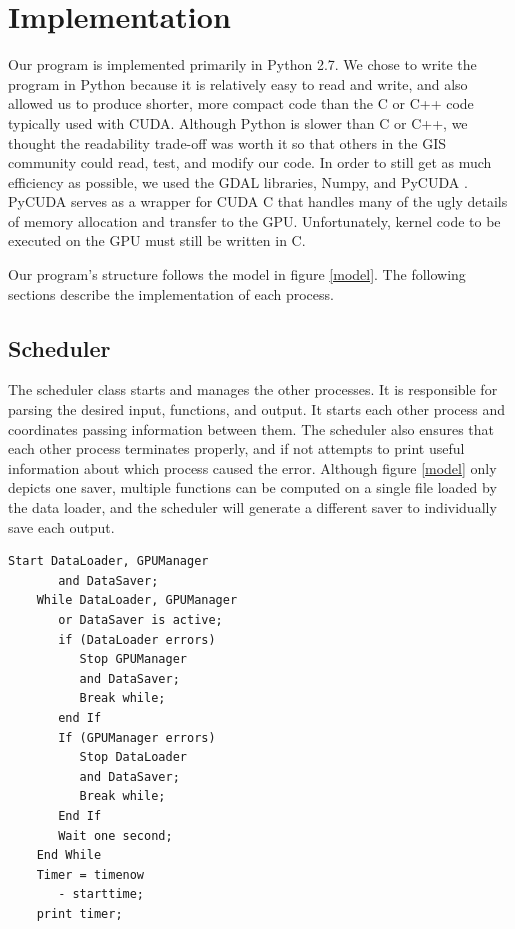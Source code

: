 \documentclass[journal]{IEEEtran}
\begin{document}
\section{Implementation} \label{implementation}
    Our program is implemented primarily in Python 2.7. We chose to write the
    program in Python because it is relatively easy to read and write, and also
    allowed us to produce shorter, more compact code than the C or C++ code
    typically used with CUDA.  Although Python is slower than C or C++, we
    thought the readability trade-off was worth it so that others in the GIS
    community could read, test, and modify our code. In order to still get as
    much efficiency as possible, we used the GDAL libraries, Numpy, and PyCUDA
    \cite{pycuda_1} \cite{pycuda_2}. PyCUDA serves as a wrapper for CUDA C that
    handles many of the ugly details of memory allocation and transfer to the
    GPU. Unfortunately, kernel code to be executed on the GPU must still be
    written in C. 
    
    Our program's structure follows the model in figure \ref{model}. The
    following sections describe the implementation of each process.

    \subsection{Scheduler}
    The scheduler class starts and manages the other processes. It is
    responsible for parsing the desired input, functions, and output. It starts
    each other process and coordinates passing information between them. The
    scheduler also ensures that each other process terminates properly, and if
    not attempts to print useful information about which process caused the
    error. Although figure \ref{model} only depicts one saver, multiple
    functions can be computed on a single file loaded by the data loader, and
    the scheduler will generate a different saver to individually save each
    output.
    
\begin{Verbatim}[frame=single, gobble=4]
    Start DataLoader, GPUManager
       and DataSaver;
    While DataLoader, GPUManager 
       or DataSaver is active;
       if (DataLoader errors)
          Stop GPUManager 
          and DataSaver;
          Break while;
       end If
       If (GPUManager errors)
          Stop DataLoader 
          and DataSaver;
          Break while;
       End If
       Wait one second;
    End While
    Timer = timenow 
       - starttime;
    print timer;
\end{Verbatim}
    \break
\end{document}
